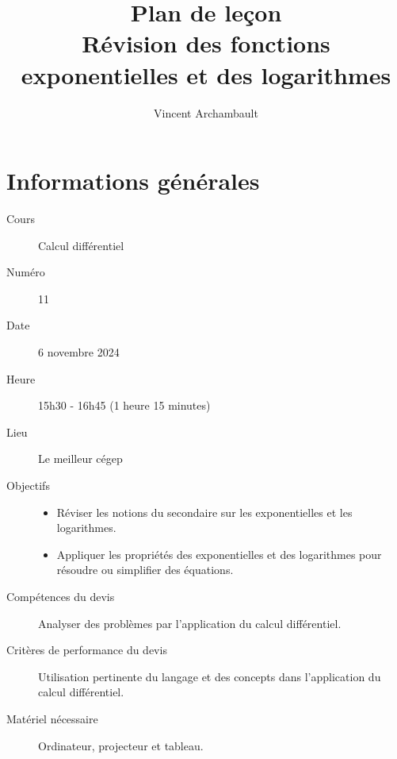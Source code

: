 \documentclass[12pt]{article}
\title{Plan de leçon\\ Révision des fonctions exponentielles et des logarithmes}
\author{Vincent Archambault}
\date{}
\begin{document}
\maketitle

\section*{Informations générales}
\begin{description}
\item[\faBook{} Cours] Calcul différentiel
\item[{\faHashtag} Numéro] 11
\item[{\faCalendar*[regular]} Date] 6 novembre 2024
\item[{\faClock[regular]} Heure] 15h30 - 16h45 (1 heure 15 minutes)
\item[\faLandmark{} Lieu] Le meilleur cégep
\item[\faBullseye{} Objectifs]
\mbox{}\newline\leavevmode\vspace{-3ex}\begin{itemize}
    \item Réviser les notions du secondaire sur les exponentielles et les logarithmes.
    \item Appliquer les propriétés des exponentielles et des logarithmes pour résoudre ou simplifier des équations.
\end{itemize}
\item[\faToolbox{} Compétences du devis] Analyser des problèmes par l’application du calcul différentiel.
\item[\faUserCheck{} Critères de performance du devis] Utilisation pertinente du langage et des concepts dans l’application du calcul différentiel.
\item[\faTv{} Matériel nécessaire] Ordinateur, projecteur et tableau.
\end{description}

\clearpage
\end{document}
